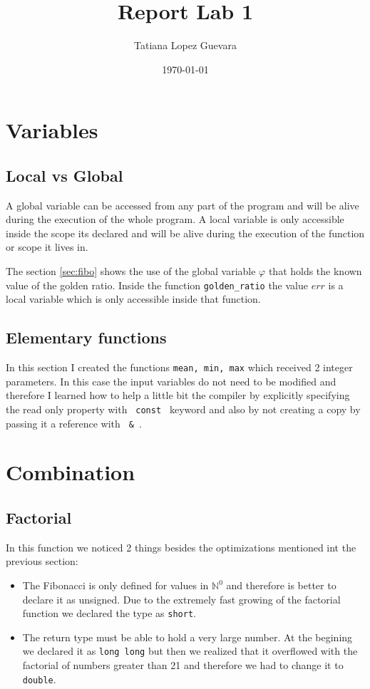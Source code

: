\documentclass{article}
\begin{document}
\title{Report Lab 1}
\date {\today}
\author{Tatiana Lopez Guevara}
\maketitle


\section{Variables}
\subsection{Local vs Global}
A global variable can be accessed from any part of the program and will 
be alive during the execution of the whole program.
A local variable is only accessible inside the scope its 
declared and will be alive during the execution of the function or scope it lives in.

The section \ref{sec:fibo} shows the use of the global variable $\varphi$ that holds 
the known value of the golden ratio. Inside the function \verb|golden_ratio| 
the value $err$ is a local variable which is only accessible inside that function.

\subsection{Elementary functions}
In this section I created the functions \verb|mean, min, max| which received 2 
integer parameters. In this case the input variables do not need to be modified
and therefore I learned how to help a little bit the compiler by explicitly 
specifying the read only property with \verb+ const + keyword and also by not 
creating a copy by passing it a reference with \verb+ & +. 

\section{Combination}
\subsection{Factorial}
In this function we noticed 2 things besides the optimizations mentioned 
int the previous section:
\begin{itemize}
\item The Fibonacci is only defined for values in $\mathbb{N}^0$ and therefore
is better to declare it as unsigned. Due to the extremely fast growing of the
factorial function we declared the type as \verb+short+.
\item The return type must be able to hold a very large number. At the begining
we declared it as \verb+long long+ but then we realized that it overflowed with
the factorial of numbers greater than 21 and therefore we had to change it to
\verb+double+.
\end{itemize}
\end{document}
